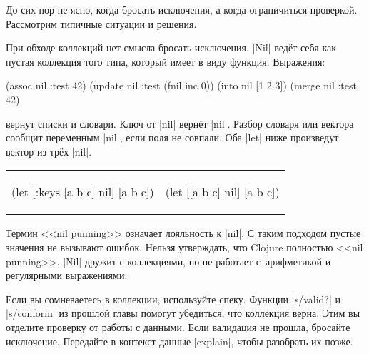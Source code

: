 До сих пор не ясно, когда бросать исключения, а когда ограничиться
проверкой. Рассмотрим типичные ситуации и решения.

При обходе коллекций нет смысла бросать исключения. \spverb|Nil| вед\"{е}т себя как
пустая коллекция того типа, который имеет в виду функция. Выражения:

\begin{english}
  \begin{clojure}
(assoc nil :test 42)
(update nil :test (fnil inc 0))
(into nil [1 2 3])
(merge nil {:test 42})
  \end{clojure}
\end{english}

\noindent
вернут списки и словари. Ключ от \spverb|nil| верн\"{е}т \spverb|nil|. Разбор
словаря или вектора сообщит переменным \spverb|nil|, если поля не совпали. Оба
\spverb|let| ниже произведут вектор из тр\"{е}х \spverb|nil|.

\noindent
\begin{tabular}{ @{}p{5cm} @{}p{5cm} }

\begin{english}
  \begin{clojure}
(let [{:keys [a b c]} nil]
  [a b c])
  \end{clojure}
\end{english}

&

\begin{english}
  \begin{clojure}
(let [[a b c] nil]
  [a b c])
  \end{clojure}
\end{english}

\end{tabular}


\noindent
Термин <<nil punning>> означает лояльность к \spverb|nil|. С таким подходом
пустые значения не вызывают ошибок. Нельзя утверждать, что Clojure полностью
<<nil punning>>. \spverb|Nil| дружит с коллекциями, но не работает с~арифметикой
и регулярными выражениями.


Если вы сомневаетесь в коллекции, используйте спеку. Функции \spverb|s/valid?| и
\spverb|s/conform| из прошлой главы  помогут убедиться, что
коллекция верна. Этим вы отделите проверку от работы с данными. Если валидация
не прошла, бросайте исключение. Передайте в контекст данные \spverb|explain|,
чтобы разобрать их позже.

